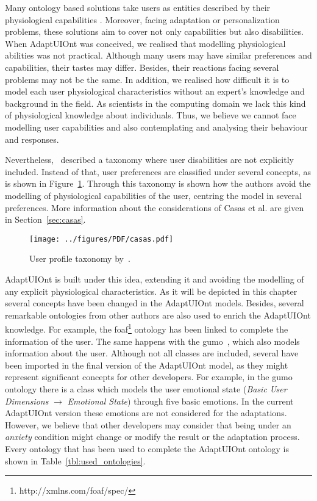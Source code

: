 Many ontology based solutions take users as entities described by their physiological
capabilities
\citep{gregor_designing_2002}\citep{razmerita_ontology_based_2003}\citep{pereira_triple_2005}\citep{persad_characterising_2007}\citep{persad_cognitive_2007}\citep{skillen2012ontological}. Moreover, facing adaptation or personalization problems, these solutions 
aim to cover not only capabilities but also disabilities. When AdaptUIOnt was 
conceived, we realised that modelling physiological abilities was not practical. 
Although many users may have similar preferences and capabilities, their tastes 
may differ. Besides, their reactions facing several problems may not be the same. 
In addition, we realised how difficult it is to model each user physiological 
characteristics without an expert's knowledge and background in the field. As 
scientists in the computing domain we lack this kind of physiological knowledge 
about individuals. Thus, we believe we cannot face modelling user capabilities 
and also contemplating and analysing their behaviour and responses.

Nevertheless,~\citet{casas_user_2008} described a taxonomy where user disabilities
are not explicitly included. Instead of that, user preferences are classified
under several concepts, as is shown in Figure~\ref{fig:casas}. Through this 
taxonomy is shown how the authors avoid the modelling of physiological capabilities 
of the user, centring the model in several preferences. More information about 
the considerations of Casas et al. are given in Section~\ref{sec:casas}.


\begin{figure}
\centering
\texttt{[image: ../figures/PDF/casas.pdf]}
\caption{User profile taxonomy by~\citet{casas_user_2008}.}
\label{fig:casas}
\end{figure}

AdaptUIOnt is built under this idea, extending it and avoiding the modelling of
any explicit physiological characteristics. As it will be depicted in this chapter
several concepts have been changed in the AdaptUIOnt models. Besides, several 
remarkable ontologies from other authors are also used to enrich the AdaptUIOnt 
knowledge. For example, the \ac{foaf}\footnote{http://xmlns.com/foaf/spec/} ontology 
has been linked to complete the information of the user. The same happens with 
the \ac{gumo}~\citep{heckmann_gumogeneral_2005}, which also models information 
about the user. Although not all classes are included, several have been imported 
in the final version of the AdaptUIOnt model, as they might represent significant
concepts for other developers. For example, in the \ac{gumo} ontology there is a
class which models the user emotional state (\textit{Basic User Dimensions} $\rightarrow$ 
\textit{Emotional State}) through five basic emotions. In  the current AdaptUIOnt 
version these emotions are not considered for the adaptations. However, we believe
that other developers may consider that being under an \textit{anxiety} condition
might change or modify the result or the adaptation process. Every ontology that
has been used to complete the AdaptUIOnt ontology is shown in Table~\ref{tbl:used_ontologies}.

